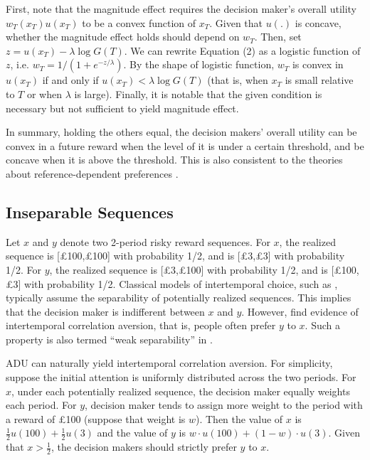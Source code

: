 \documentclass[
  12pt,
]{article}
\begin{document}
First, note that the magnitude effect requires the decision maker's
overall utility \(w_T(x_T)u(x_T)\) to be a convex function of \(x_T\).
Given that \(u(.)\) is concave, whether the magnitude effect holds
should depend on \(w_T\). Then, set \(z = u(x_T)-\lambda\log G(T)\). We
can rewrite Equation (2) as a logistic function of \(z\), i.e.
\(w_T = 1/(1+e^{-z/\lambda})\). By the shape of logistic function,
\(w_T\) is convex in \(u(x_T)\) if and only if
\(u(x_T)<\lambda \log G(T)\) (that is, when \(x_T\) is small relative to
\(T\) or when \(\lambda\) is large). Finally, it is notable that the
given condition is necessary but not sufficient to yield magnitude
effect.

In summary, holding the others equal, the decision makers' overall
utility can be convex in a future reward when the level of it is under a
certain threshold, and be concave when it is above the threshold. This
is also consistent to the theories about reference-dependent preferences
\citep{koszegi_model_2006}.

\hypertarget{inseparable-sequences}{%
\subsection{Inseparable Sequences}\label{inseparable-sequences}}

Let \(x\) and \(y\) denote two 2-period risky reward sequences. For
\(x\), the realized sequence is {[}£100,£100{]} with probability 1/2,
and is {[}£3,£3{]} with probability 1/2. For \(y\), the realized
sequence is {[}£3,£100{]} with probability 1/2, and is {[}£100,£3{]}
with probability 1/2. Classical models of intertemporal choice, such as
\citet{fishburn_time_1982}, typically assume the separability of
potentially realized sequences. This implies that the decision maker is
indifferent between \(x\) and \(y\). However,
\citet{andersen_multiattribute_2018} find evidence of intertemporal
correlation aversion, that is, people often prefer \(y\) to \(x\). Such
a property is also termed ``weak separability'' in
\citet{noor_constrained_2023}.

ADU can naturally yield intertemporal correlation aversion. For
simplicity, suppose the initial attention is uniformly distributed
across the two periods. For \(x\), under each potentially realized
sequence, the decision maker equally weights each period. For \(y\),
decision maker tends to assign more weight to the period with a reward
of £100 (suppose that weight is \(w\)). Then the value of \(x\) is
\(\frac{1}{2} u(100) + \frac{1}{2} u(3)\) and the value of \(y\) is
\(w\cdot u(100) +(1-w) \cdot u(3)\). Given that \(x>\frac{1}{2}\), the
decision makers should strictly prefer \(y\) to \(x\).
\end{document}
